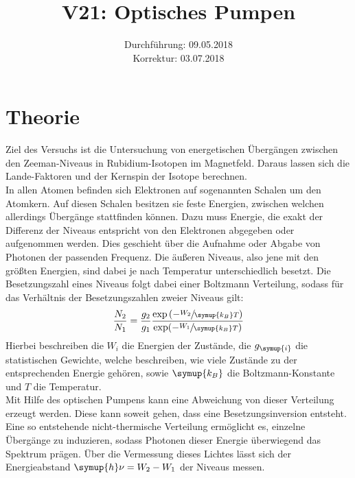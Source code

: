 \documentclass[
  bibliography=totoc,     %
  captions=tableheading,  %
  titlepage=firstiscover, %
]{scrartcl}
\title{V21: Optisches Pumpen}
\author{
  Simon Schulte
  \texorpdfstring{
    \\
    \href{mailto:simon.schulte@udo.edu}{simon.schulte@udo.edu}
  }{}
  \texorpdfstring{\and}{, }
  Tim Sedlaczek
  \texorpdfstring{
    \\
    \href{mailto:tim.sedlaczek@udo.edu}{tim.sedlaczek@udo.edu}
  }{}
}
\date{Durchführung: 09.05.2018\\
      Korrektur: 03.07.2018}
\begin{document}
\maketitle
\thispagestyle{empty}
\setcounter{page}{1}
\section{Theorie}
\label{sec:theorie}
Ziel des Versuchs ist die Untersuchung von energetischen Übergängen zwischen den
Zeeman-Niveaus in Rubidium-Isotopen im Magnetfeld. Daraus lassen sich die
Lande-Faktoren und der Kernspin der Isotope berechnen. \\
In allen Atomen befinden sich Elektronen auf sogenannten Schalen um den
Atomkern. Auf diesen Schalen besitzen sie feste Energien, zwischen welchen
allerdings Übergänge stattfinden können. Dazu muss Energie, die exakt der
Differenz der Niveaus entspricht von den Elektronen abgegeben oder aufgenommen
werden. Dies geschieht über die Aufnahme oder Abgabe von Photonen der
passenden Frequenz. Die äußeren Niveaus, also jene mit den größten Energien,
sind dabei je nach Temperatur unterschiedlich besetzt. Die Besetzungszahl eines
Niveaus folgt dabei einer Boltzmann Verteilung, sodass für das Verhältnis der
Besetzungszahlen zweier Niveaus gilt:
%
\begin{equation}
  \frac{N_2}{N_1}=\frac{g_2}{g_1}\frac{\exp\left(-\sfrac{W_2}{\symup{k_B}T}\right)}{\exp(-\sfrac{W_1}{\symup{k_B}T})}
\end{equation}
%
Hierbei beschreiben die $W_i$ die Energien der Zustände, die $g_{\symup{i}}$ die
statistischen Gewichte, welche beschreiben, wie viele Zustände zu der entsprechenden
Energie gehören, sowie $\symup{k_B}$ die Boltzmann-Konstante und $T$ die
Temperatur. \\
Mit Hilfe des optischen Pumpens kann eine Abweichung von dieser Verteilung
erzeugt werden. Diese kann soweit gehen, dass eine Besetzungsinversion
entsteht. Eine so entstehende nicht-thermische Verteilung ermöglicht es,
einzelne Übergänge zu induzieren, sodass Photonen dieser Energie überwiegend
das Spektrum prägen. Über die Vermessung dieses Lichtes lässt sich der
Energieabstand $\symup{h}\nu=W_2-W_1$ der Niveaus messen.
\end{document}
